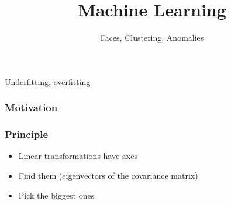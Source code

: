 
\title{Machine Learning}
\subtitle{Faces, Clustering, Anomalies}




\begin{frame}
  \titlepage
\end{frame}



\begin{frame}{Underfitting, overfitting}
\end{frame}

\begin{frame}
\end{frame}

\begin{frame}
\end{frame}

\begin{frame}
\end{frame}

\begin{frame}
\end{frame}

\begin{frame}
\end{frame}

\begin{frame}
\end{frame}


\begin{frame}
  \frametitle{Motivation}
\end{frame}

\begin{frame}[t]
  \frametitle{Principle}

  \vspace{1cm}
  \begin{itemize}
  \item Linear transformations have axes
  \item Find them (eigenvectors of the covariance matrix)
  \item Pick the biggest ones
  \end{itemize}

  \vspace{5mm}
\end{frame}

